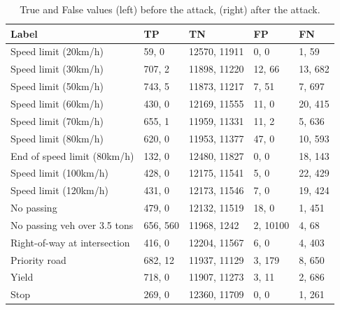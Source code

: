 \begin{table}[ht!]
\centering
  \begin{tabular}{| l | p{1.5cm} | p{2cm} | p{1.5cm} | p{1.5cm} |}
  \hline
  \rowcolor{lightgray} Label & TP & TN & FP & FN \\ [0.5ex]
  \hline
  Speed limit (20km/h) & 59, 0 & 12570, 11911 & 0, 0 & 1, 59\\
  \hline
  Speed limit (30km/h) & 707, 2 & 11898, 11220 & 12, 66 & 13, 682\\
  \hline
  Speed limit (50km/h) & 743, 5 & 11873, 11217 & 7, 51 & 7, 697\\
  \hline
  Speed limit (60km/h) & 430, 0 & 12169, 11555 & 11, 0 & 20, 415\\
  \hline
  Speed limit (70km/h) & 655, 1 & 11959, 11331 & 11, 2 & 5, 636\\
  \hline
  Speed limit (80km/h) & 620, 0 & 11953, 11377 & 47, 0 & 10, 593\\
  \hline
  End of speed limit (80km/h) & 132, 0 & 12480, 11827 & 0, 0 & 18, 143\\
  \hline
  Speed limit (100km/h) & 428, 0 & 12175, 11541 & 5, 0 & 22, 429\\
  \hline
  Speed limit (120km/h) & 431, 0 & 12173, 11546 & 7, 0 & 19, 424\\
  \hline
  No passing & 479, 0 & 12132, 11519 & 18, 0 & 1, 451\\
  \hline
  No passing veh over 3.5 tons & 656, 560 & 11968, 1242 & 2, 10100 & 4, 68\\
  \hline
  Right-of-way at intersection & 416, 0 & 12204, 11567 & 6, 0 & 4, 403\\
  \hline
  Priority road & 682, 12 & 11937, 11129 & 3, 179 & 8, 650\\
  \hline
  Yield & 718, 0 & 11907, 11273 & 3, 11 & 2, 686\\
  \hline
  Stop & 269, 0 & 12360, 11709 & 0, 0 & 1, 261\\
  \hline
  \end{tabular}
  \caption{True and False values (left) before the attack, (right) after the attack.}
  \label{tab:pos_neg_1}
\end{table}

